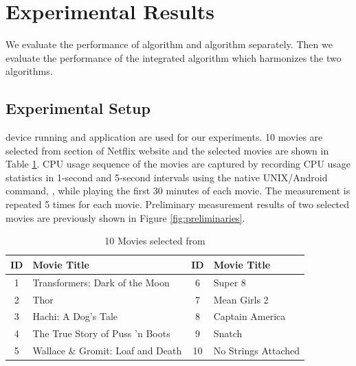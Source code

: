 \section{Experimental Results}
\label{sec:experiments}

We evaluate the performance of  algorithm and  algorithm separately.
Then we evaluate the performance of the integrated algorithm which harmonizes the two algorithms. 

\subsection{Experimental Setup}
\label{sec:experimental_setup}

 device running  and  application are used for our experiments. 
10 movies are selected from  section of Netflix website and the selected movies are shown in Table \ref{tab:movies}.
CPU usage sequence of the movies are captured by recording CPU usage statistics in 1-second and 5-second intervals using the native UNIX/Android command, , while playing the first 30 minutes of each movie. 
The measurement is repeated 5 times for each movie.
Preliminary measurement results of two selected movies are previously shown in Figure \ref{fig:preliminaries}.

\begin{table}[!t]
\begin{center}
\begin{tabular}{|c | m{5cm} ||c| m{5cm}|}
\hline
ID & Movie Title & ID & Movie Title \\ 
\hline
1 & Transformers: Dark of the Moon 		& 6 & Super 8\\
2 & Thor					& 7 & Mean Girls 2 \\
3 & Hachi: A Dog's Tale 			& 8 & Captain America \\
4 & The True Story of Puss 'n Boots 		& 9 &  Snatch \\
5 & Wallace \& Gromit: Loaf and Death 	& 10 & No Strings Attached \\
\hline
\end{tabular}
\end{center}
\caption{10 Movies selected from }
\label{tab:movies}
\end{table}

